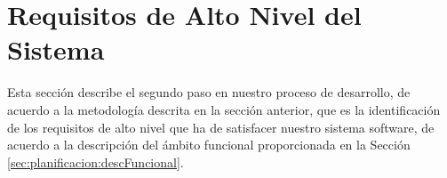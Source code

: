 \section{Requisitos de Alto Nivel del Sistema}
\label{sec:planificacion:requisitos}

Esta sección describe el segundo paso en nuestro proceso de desarrollo, de acuerdo a la metodología descrita en la sección anterior, que es la identificación de los requisitos de alto nivel que ha de satisfacer nuestro sistema software, de acuerdo a la descripción del ámbito funcional proporcionada en la Sección~ \ref{sec:planificacion:descFuncional}.
\newline
%
%
%
%
%
%
%

